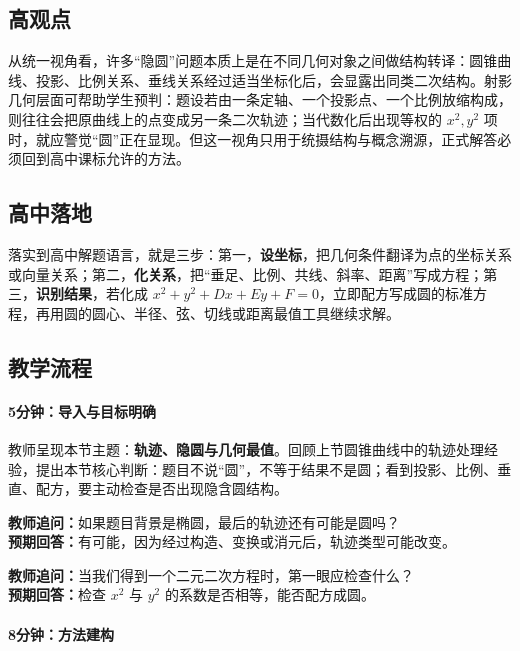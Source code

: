 \documentclass[UTF8,a4paper,11pt]{ctexart}
\begin{document}
\subsection*{高观点}

从统一视角看，许多“隐圆”问题本质上是在不同几何对象之间做结构转译：圆锥曲线、投影、比例关系、垂线关系经过适当坐标化后，会显露出同类二次结构。射影几何层面可帮助学生预判：题设若由一条定轴、一个投影点、一个比例放缩构成，则往往会把原曲线上的点变成另一条二次轨迹；当代数化后出现等权的 $x^2,y^2$ 项时，就应警觉“圆”正在显现。但这一视角只用于统摄结构与概念溯源，正式解答必须回到高中课标允许的方法。

\subsection*{高中落地}

落实到高中解题语言，就是三步：第一，\textbf{设坐标}，把几何条件翻译为点的坐标关系或向量关系；第二，\textbf{化关系}，把“垂足、比例、共线、斜率、距离”写成方程；第三，\textbf{识别结果}，若化成 $x^2+y^2+Dx+Ey+F=0$，立即配方写成圆的标准方程，再用圆的圆心、半径、弦、切线或距离最值工具继续求解。

\subsection*{教学流程}

\paragraph{5分钟：导入与目标明确}

教师呈现本节主题：\textbf{轨迹、隐圆与几何最值}。回顾上节圆锥曲线中的轨迹处理经验，提出本节核心判断：题目不说“圆”，不等于结果不是圆；看到投影、比例、垂直、配方，要主动检查是否出现隐含圆结构。

\noindent\textbf{教师追问：}如果题目背景是椭圆，最后的轨迹还有可能是圆吗？\\

\textbf{预期回答：}有可能，因为经过构造、变换或消元后，轨迹类型可能改变。\par

\noindent\textbf{教师追问：}当我们得到一个二元二次方程时，第一眼应检查什么？\\

\textbf{预期回答：}检查 $x^2$ 与 $y^2$ 的系数是否相等，能否配方成圆。\par

\paragraph{8分钟：方法建构}
\end{document}
